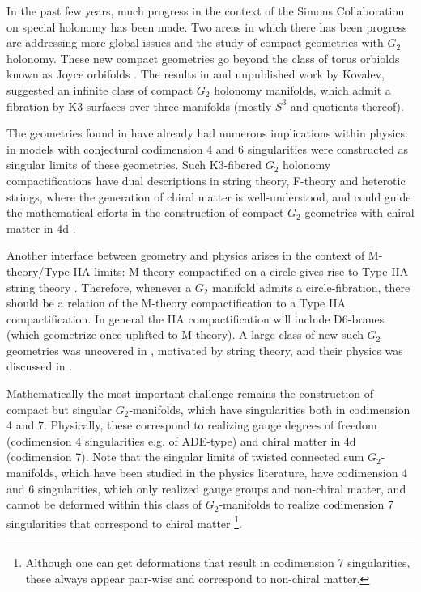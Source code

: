 \documentclass[12pt]{article}
\begin{document}
In the past few years, much progress in the context of the Simons Collaboration on special holonomy \cite{SimonsCollab:SpecialHolonomy} has been made. Two areas in which there has been progress are addressing more global issues and the study of   compact geometries with $G_2$ holonomy. These new compact geometries go beyond the class of torus orbiolds known as Joyce orbifolds
\cite{Joyce1,Joyce2}. 
The results in \cite{Corti:2012kd} and unpublished work by Kovalev, suggested an infinite class of compact $G_2$ holonomy manifolds, which admit a fibration by K3-surfaces over three-manifolds (mostly $S^3$ and quotients thereof).  

The geometries found in \cite{Corti:2012kd} have already had numerous implications within physics: 
in \cite{Braun:2017uku} models with conjectural codimension 4 and 6 singularities were constructed as singular limits of these geometries. 
Such K3-fibered $G_2$ holonomy compactifications have dual descriptions in string theory, F-theory and heterotic strings, where the generation of chiral matter is well-understood, and could guide the mathematical efforts in the construction of compact $G_2$-geometries with chiral matter in 4d \cite{Pantev:2009de,Braun:2017uku,Braun:2018vhk,Barbosa:2019bgh,Cvetic:2020piw}. 

Another interface between geometry and physics arises in the context of M-theory/Type IIA limits: M-theory compactified on a circle gives rise to Type IIA string theory \cite{Witten:1995ex}. Therefore, whenever a $G_2$ manifold admits a circle-fibration, there should be a relation of the M-theory compactification to a Type IIA compactification. In general the IIA compactification will include D6-branes (which geometrize once uplifted to M-theory). A large class of new such $G_2$ geometries was uncovered in \cite{Foscolo:2018mfs}, motivated by string theory, and their physics was discussed in \cite{Acharya:2020vmg}. 

 Mathematically the most important challenge remains the construction of  compact but singular $G_2$-manifolds, which have singularities both in codimension 4 and 7. Physically, these correspond to realizing gauge degrees of freedom (codimension 4 singularities e.g. of ADE-type) and chiral matter in 4d (codimension 7). 
 Note that the singular limits of twisted connected sum $G_2$-manifolds, which have been studied in the physics literature, have codimension 4 and 6 singularities, which only realized gauge groups and non-chiral matter, and  cannot be deformed within this class of $G_2$-manifolds to realize codimension 7 singularities that correspond to chiral matter \cite{Braun:2018vhk}\footnote{Although one can get deformations that result in codimension 7 singularities, these always appear pair-wise and correspond to non-chiral matter.}.
 
\end{document}
